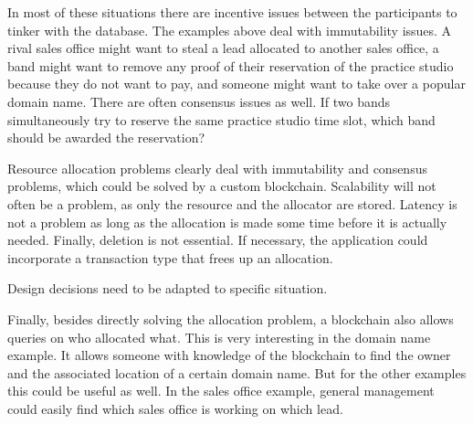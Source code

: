In most of these situations there are incentive issues between the participants to tinker with the database. The examples above deal with immutability issues. A rival sales office might want to steal a lead allocated to another sales office, a band might want to remove any proof of their reservation of the practice studio because they do not want to pay, and someone might want to take over a popular domain name. There are often consensus issues as well. If two bands simultaneously try to reserve the same practice studio time slot, which band should be awarded the reservation?

Resource allocation problems clearly deal with immutability and consensus problems, which could be solved by a custom blockchain. Scalability will not often be a problem, as only the resource and the allocator are stored. Latency is not a problem as long as the allocation is made some time before it is actually needed. Finally, deletion is not essential. If necessary, the application could incorporate a transaction type that frees up an allocation.

Design decisions need to be adapted to specific situation.

Finally, besides directly solving the allocation problem, a blockchain also allows queries on who allocated what. This is very interesting in the domain name example. It allows someone with knowledge of the blockchain to find the owner and the associated location of a certain domain name. But for the other examples this could be useful as well. In the sales office example, general management could easily find which sales office is working on which lead.
